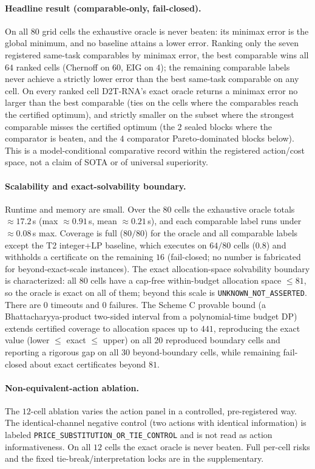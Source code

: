 \documentclass[11pt]{article}
\begin{document}
\paragraph{Headline result (comparable-only, fail-closed).}
On all $80$ grid cells the exhaustive oracle is never beaten: its minimax error is the global minimum,
and no baseline attains a lower error. Ranking only the seven registered same-task comparables by
minimax error, the best comparable wins all $64$ ranked cells (Chernoff on $60$, EIG on $4$); the
remaining comparable labels never achieve a strictly lower error than the best same-task comparable on
any cell. On every ranked cell D2T-RNA's exact oracle returns a minimax error no larger than the best
comparable (ties on the cells where the comparables reach the certified optimum), and strictly smaller
on the subset where the strongest comparable misses the certified optimum (the $2$ sealed blocks where
the comparator is beaten, and the $4$ comparator Pareto-dominated blocks below). This is a
model-conditional comparative record within the registered action/cost space, not a claim of SOTA or
of universal superiority.

\paragraph{Scalability and exact-solvability boundary.}
Runtime and memory are small. Over the $80$ cells the exhaustive oracle totals $\approx 17.2$\,s
(max $\approx 0.91$\,s, mean $\approx 0.21$\,s), and each comparable label runs under $\approx 0.08$\,s
max. Coverage is full ($80/80$) for the oracle and all comparable labels except the T2 integer+LP
baseline, which executes on $64/80$ cells ($0.8$) and withholds a certificate on the remaining $16$
(fail-closed; no number is fabricated for beyond-exact-scale instances). The exact allocation-space
solvability boundary is characterized: all $80$ cells have a cap-free within-budget allocation space
$\le 81$, so the oracle is exact on all of them; beyond this scale is \texttt{UNKNOWN\_NOT\_ASSERTED}.
There are $0$ timeouts and $0$ failures. The Scheme C provable bound (a Bhattacharyya-product two-sided
interval from a polynomial-time budget DP) extends certified coverage to allocation spaces up to $441$,
reproducing the exact value (lower $\le$ exact $\le$ upper) on all $20$ reproduced boundary cells and
reporting a rigorous gap on all $30$ beyond-boundary cells, while remaining fail-closed about exact
certificates beyond $81$.

\paragraph{Non-equivalent-action ablation.}
The $12$-cell ablation varies the action panel in a controlled, pre-registered way. The identical-channel
negative control (two actions with identical information) is labeled
\texttt{PRICE\_SUBSTITUTION\_OR\_TIE\_CONTROL} and is not read as action informativeness. On all $12$
cells the exact oracle is never beaten. Full per-cell risks and the fixed tie-break/interpretation
locks are in the supplementary.
\end{document}
